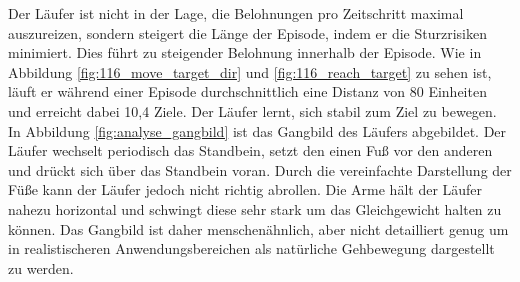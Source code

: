 Der Läufer ist nicht in der Lage, die Belohnungen pro Zeitschritt maximal auszureizen, sondern steigert die Länge der Episode, indem er die Sturzrisiken minimiert. Dies führt zu steigender Belohnung innerhalb der Episode. Wie in Abbildung \ref{fig:116_move_target_dir} und \ref{fig:116_reach_target} zu sehen ist, läuft er während einer Episode durchschnittlich eine Distanz von 80 Einheiten und erreicht dabei 10,4 Ziele. Der Läufer lernt, sich stabil zum Ziel zu bewegen. In Abbildung \ref{fig:analyse_gangbild} ist das Gangbild des Läufers abgebildet. Der Läufer wechselt periodisch das Standbein, setzt den einen Fuß vor den anderen und drückt sich über das Standbein voran. Durch die vereinfachte Darstellung der Füße kann der Läufer jedoch nicht richtig abrollen. Die Arme hält der Läufer nahezu horizontal und schwingt diese sehr stark um das Gleichgewicht halten zu können. Das Gangbild ist daher menschenähnlich, aber nicht detailliert genug um in realistischeren Anwendungsbereichen als natürliche Gehbewegung dargestellt zu werden.

